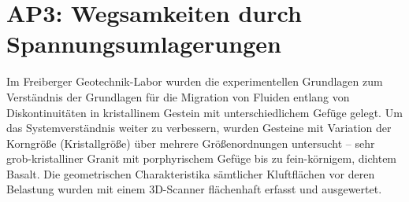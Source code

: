 \section*{AP3: Wegsamkeiten durch Spannungsumlagerungen}
\label{sec:wp3}

Im Freiberger Geotechnik-Labor wurden die experimentellen Grundlagen zum Verständnis der Grundlagen für die Migration von Fluiden entlang von Diskontinuitäten in kristallinem Gestein mit unterschiedlichem Gefüge gelegt.
Um das Systemverständnis weiter zu verbessern, wurden Gesteine mit Variation der Korngrö{\ss}e (Kristallgrö{\ss}e) über mehrere Grö{\ss}enordnungen untersucht -- sehr grob-kristalliner Granit mit porphyrischem Gefüge bis zu fein-körnigem, dichtem Basalt. Die geometrischen Charakteristika sämtlicher Kluftflächen vor deren Belastung wurden mit einem 3D-Scanner flächenhaft erfasst und ausgewertet. 

